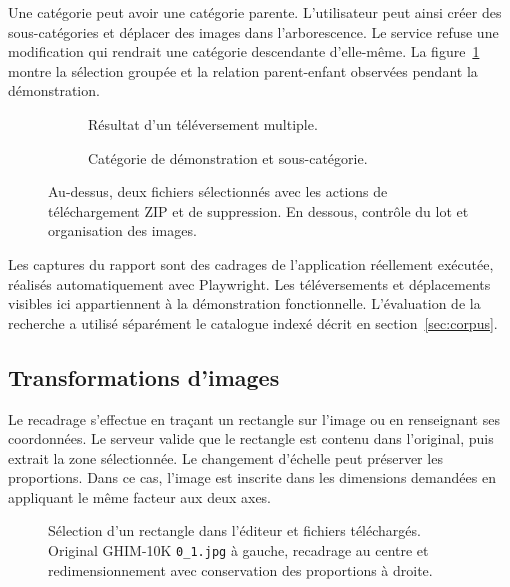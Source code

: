 Une catégorie peut avoir une catégorie parente. L'utilisateur peut ainsi créer des sous-catégories et déplacer des images dans l'arborescence. Le service refuse une modification qui rendrait une catégorie descendante d'elle-même. La figure~\ref{fig:gestion-lots} montre la sélection groupée et la relation parent-enfant observées pendant la démonstration.

\begin{figure}[ht]
  \centering
  \par\smallskip
  \begin{subfigure}[t]{0.47\linewidth}
    \centering
    \caption{Résultat d'un téléversement multiple.}
  \end{subfigure}\hfill
  \begin{subfigure}[t]{0.50\linewidth}
    \centering
    \caption{Catégorie de démonstration et sous-catégorie.}
  \end{subfigure}
  \caption{Au-dessus, deux fichiers sélectionnés avec les actions de téléchargement ZIP et de suppression. En dessous, contrôle du lot et organisation des images.}
  \label{fig:gestion-lots}
\end{figure}

Les captures du rapport sont des cadrages de l'application réellement exécutée, réalisés automatiquement avec Playwright. Les téléversements et déplacements visibles ici appartiennent à la démonstration fonctionnelle. L'évaluation de la recherche a utilisé séparément le catalogue indexé décrit en section~\ref{sec:corpus}.

\clearpage
\subsection{Transformations d'images}
Le recadrage s'effectue en traçant un rectangle sur l'image ou en renseignant ses coordonnées. Le serveur valide que le rectangle est contenu dans l'original, puis extrait la zone sélectionnée. Le changement d'échelle peut préserver les proportions. Dans ce cas, l'image est inscrite dans les dimensions demandées en appliquant le même facteur aux deux axes.

\begin{figure}[ht]
  \centering
  \par\smallskip
  \caption{Sélection d'un rectangle dans l'éditeur et fichiers téléchargés. Original GHIM-10K \texttt{0\_1.jpg} à gauche, recadrage au centre et redimensionnement avec conservation des proportions à droite.}
  \label{fig:transformations}
\end{figure}

